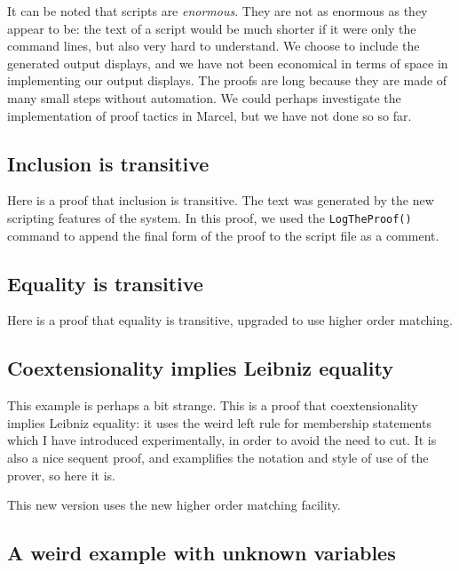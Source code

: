 \documentclass{article}
\begin{document}
It can be noted that scripts are {\em enormous\/}.  They are not as enormous as they appear to be:  the text of a script would be much shorter if it were only the command lines, but also very hard to understand.  We choose to include the generated output displays, and we have not been economical in terms of space in implementing our output displays.   The proofs are long because they are made of many small steps without automation.  We could perhaps investigate the implementation of proof tactics in Marcel, but we have not done so so far.

\subsection{Inclusion is transitive}

Here is a proof that inclusion is transitive.  The text was generated by the new scripting features of the system.   In this proof,
we used the {\tt LogTheProof()} command to append the final form of the proof to the script file as a comment.


\subsection{Equality is transitive}

Here is a proof that equality is transitive, upgraded to use higher order matching.



\subsection{Coextensionality implies Leibniz equality}

This example is perhaps a bit strange.  This is a proof that coextensionality implies Leibniz equality:  it uses the weird left rule for membership
statements which I have introduced experimentally, in order to avoid the need to cut.  It is also a nice sequent proof, and examplifies the notation and style of use of the prover, so here it is.


This new version uses the new higher order matching facility.





\subsection{A weird example with unknown variables}
\end{document}
